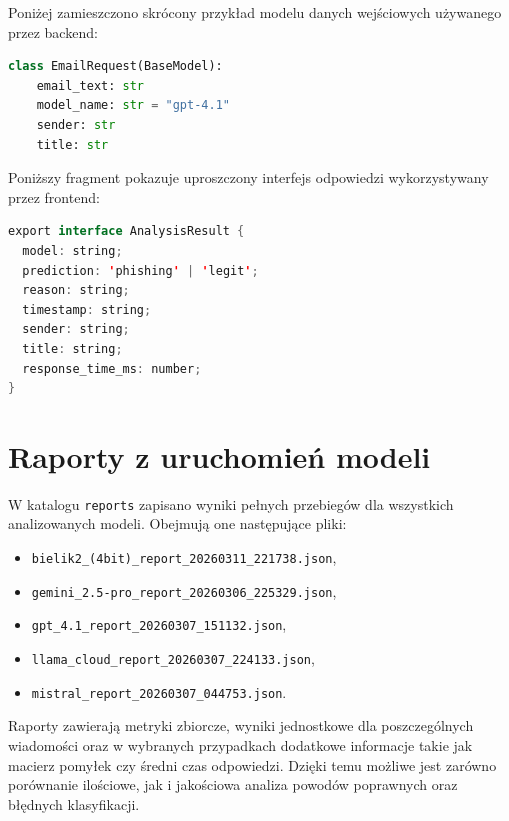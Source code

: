 \documentclass[12pt,a4paper,openright]{report}
\begin{document}
Poniżej zamieszczono skrócony przykład modelu danych wejściowych używanego przez backend:

\begin{lstlisting}[language=Python,caption={Przykładowa struktura żądania wejściowego w backendzie}]
class EmailRequest(BaseModel):
    email_text: str
    model_name: str = "gpt-4.1"
    sender: str
    title: str
\end{lstlisting}

Poniższy fragment pokazuje uproszczony interfejs odpowiedzi wykorzystywany przez frontend:

\begin{lstlisting}[language=Java,caption={Przykładowa struktura wyniku analizy w warstwie frontendowej}]
export interface AnalysisResult {
  model: string;
  prediction: 'phishing' | 'legit';
  reason: string;
  timestamp: string;
  sender: string;
  title: string;
  response_time_ms: number;
}
\end{lstlisting}

\section{Raporty z uruchomień modeli}

W katalogu \texttt{reports} zapisano wyniki pełnych przebiegów dla wszystkich analizowanych modeli. Obejmują one następujące pliki:

\begin{itemize}
    \item \texttt{bielik2\_(4bit)\_report\_20260311\_221738.json},
    \item \texttt{gemini\_2.5-pro\_report\_20260306\_225329.json},
    \item \texttt{gpt\_4.1\_report\_20260307\_151132.json},
    \item \texttt{llama\_cloud\_report\_20260307\_224133.json},
    \item \texttt{mistral\_report\_20260307\_044753.json}.
\end{itemize}

Raporty zawierają metryki zbiorcze, wyniki jednostkowe dla poszczególnych wiadomości oraz w wybranych przypadkach dodatkowe informacje takie jak macierz pomyłek czy średni czas odpowiedzi. Dzięki temu możliwe jest zarówno porównanie ilościowe, jak i jakościowa analiza powodów poprawnych oraz błędnych klasyfikacji.
\end{document}
